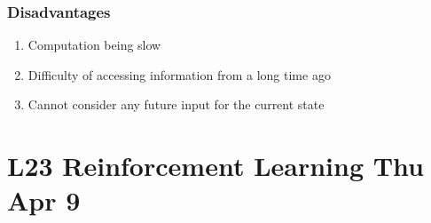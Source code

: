 \documentclass[12pt]{article}
\newenvironment{QandA}{\begin{enumerate}[label=\bfseries\arabic*.]\bfseries}
{\end{enumerate}}
\newenvironment{answered}{\par\normalfont\color{Sepia}}{}
\begin{document}
\begin{QandA}
\begin{answered}
        \subsubsection*{Disadvantages}
        \begin{enumerate}
            \item Computation being slow
            \item Difficulty of accessing information from a long time ago
            \item Cannot consider any future input for the current state
        \end{enumerate}
    \end{answered}

\end{QandA}

\section*{L23 Reinforcement Learning \textemdash{} Thu Apr 9}
\end{document}
